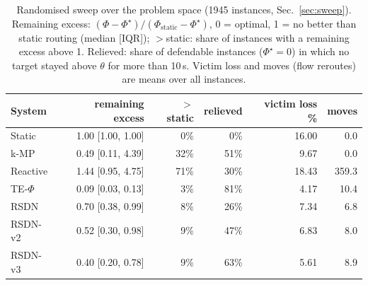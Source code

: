\begin{table}[t]\centering\scriptsize
\caption{Randomised sweep over the problem space (1945 instances, Sec.~\ref{sec:sweep}). Remaining excess: $(\Phi-\Phi^\star)/(\Phi_{\mathrm{static}}-\Phi^\star)$, 0 = optimal, 1 = no better than static routing (median [IQR]); $>$static: share of instances with a remaining excess above 1. Relieved: share of defendable instances ($\Phi^\star=0$) in which no target stayed above $\theta$ for more than 10\,s. Victim loss and moves (flow reroutes) are means over all instances.}
\label{tab:sweep}
\setlength{\tabcolsep}{3pt}
\begin{tabular}{lrrrrr}
\toprule
System & remaining excess & $>$static & relieved & victim loss \% & moves\\
\midrule
Static & 1.00 [1.00, 1.00] & 0\% & 0\% & 16.00 & 0.0\\
k-MP & 0.49 [0.11, 4.39] & 32\% & 51\% & 9.67 & 0.0\\
Reactive & 1.44 [0.95, 4.75] & 71\% & 30\% & 18.43 & 359.3\\
TE-$\Phi$ & 0.09 [0.03, 0.13] & 3\% & 81\% & 4.17 & 10.4\\
RSDN & 0.70 [0.38, 0.99] & 8\% & 26\% & 7.34 & 6.8\\
RSDN-v2 & 0.52 [0.30, 0.98] & 9\% & 47\% & 6.83 & 8.0\\
RSDN-v3 & 0.40 [0.20, 0.78] & 9\% & 63\% & 5.61 & 8.9\\
\bottomrule
\end{tabular}
\end{table}